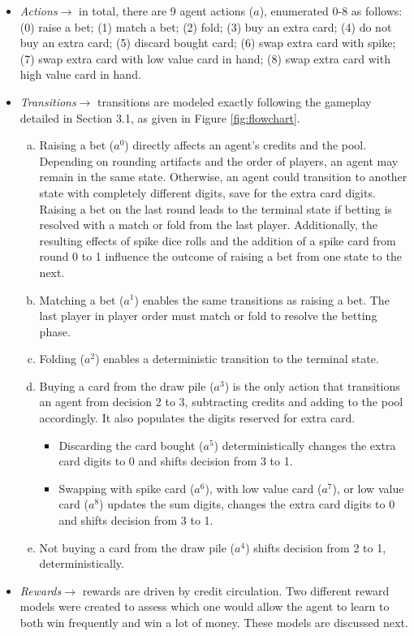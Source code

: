 \documentclass{article}
\begin{document}
\begin{itemize}
    \item \textit{Actions}$\rightarrow$ in total, there are 9 agent actions ($a$), enumerated 0-8 as follows: (0) raise a bet; (1) match a bet; (2) fold; (3) buy an extra card; (4) do not buy an extra card; (5) discard bought card; (6) swap extra card with spike; (7) swap extra card with low value card in hand; (8) swap extra card with high value card in hand.
    \item \textit{Transitions}$\rightarrow$ transitions are modeled exactly following the gameplay detailed in Section 3.1, as given in Figure \ref{fig:flowchart}.
    \begin{enumerate}[a)]
        \item Raising a bet ($a^0$) directly affects an agent's credits and the pool. Depending on rounding artifacts and the order of players, an agent may remain in the same state. Otherwise, an agent could transition to another state with completely different digits, save for the extra card digits. Raising a bet on the last round leads to the terminal state if betting is resolved with a match or fold from the last player. Additionally, the resulting effects of spike dice rolls and the addition of a spike card from round 0 to 1 influence the outcome of raising a bet from one state to the next.
        \item Matching a bet ($a^1$) enables the same transitions as raising a bet. The last player in player order must match or fold to resolve the betting phase.
        \item Folding ($a^2$) enables a deterministic transition to the terminal state.
        \item Buying a card from the draw pile ($a^3$) is the only action that transitions an agent from decision 2 to 3, subtracting credits and adding to the pool accordingly. It also populates the digits reserved for extra card.
        \begin{itemize}
            \item Discarding the card bought ($a^5$) deterministically changes the extra card digits to 0 and shifts decision from 3 to 1.
            \item Swapping with spike card ($a^6$), with low value card ($a^7$), or low value card ($a^8$) updates the sum digits, changes the extra card digits to 0 and shifts decision from 3 to 1.
        \end{itemize}
        \item Not buying a card from the draw pile ($a^4$) shifts decision from 2 to 1, deterministically.
    \end{enumerate}
    \item \textit{Rewards}$\rightarrow$ rewards are driven by credit circulation. Two different reward models were created to assess which one would allow the agent to learn to both win frequently and win a lot of money. These models are discussed next.
\end{itemize}
\end{document}
